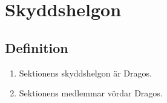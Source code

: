 \documentclass[11pt,a4paper]{article}
\begin{document}
\newpage

\section{Skyddshelgon}

\subsection{Definition}

\begin{enumerate}[\thesubsection.1]

  \item Sektionens skyddshelgon är Dragos.

  \item Sektionens medlemmar vördar Dragos.

\end{enumerate}

\end{document}
